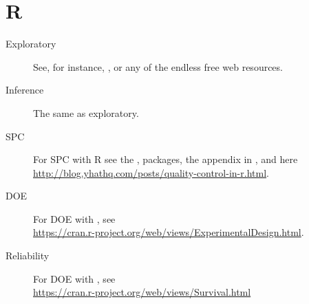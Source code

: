 


\chapter{R}
\label{apx:r}

\begin{description}
\item [Exploratory] See, for instance, \cite{venables_modern_2002}, or any of the endless free web resources. 
\item [Inference] The same as exploratory.
\item [SPC] For SPC with R see the ,  packages, the appendix in \cite{qiu_introduction_2013}, and here \\ \url{http://blog.yhathq.com/posts/quality-control-in-r.html}.
\item [DOE] For DOE with \R, see \\ \url{https://cran.r-project.org/web/views/ExperimentalDesign.html}.
\item [Reliability] For DOE with \R, see \\ \url{https://cran.r-project.org/web/views/Survival.html}
\end{description}


